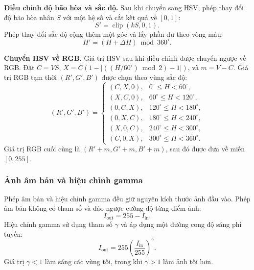 \documentclass[12pt]{article}
\numberwithin{equation}{section}
\begin{document}
\textbf{Điều chỉnh độ bão hòa và sắc độ.}
Sau khi chuyển sang HSV, phép thay đổi độ bão hòa nhân $S$ với một hệ số và cắt
kết quả về $[0,1]$:
\begin{equation}
S' = \operatorname{clip}(kS,0,1).
\label{eq:saturation}
\end{equation}
Phép thay đổi sắc độ cộng thêm một góc và lấy phần dư theo vòng màu:
\begin{equation}
H' = (H+\Delta H) \bmod 360^\circ.
\label{eq:hue-shift}
\end{equation}

\textbf{Chuyển HSV về RGB.}
Giá trị HSV sau khi điều chỉnh được chuyển ngược về RGB. Đặt
$C=VS$, $X=C(1-|((H/60^\circ)\bmod 2)-1|)$, và $m=V-C$. Giá trị RGB tạm thời
$(R',G',B')$ được chọn theo vùng sắc độ:
\begin{equation}
(R',G',B') =
\begin{cases}
(C,X,0), & 0^\circ \le H < 60^\circ,\\
(X,C,0), & 60^\circ \le H < 120^\circ,\\
(0,C,X), & 120^\circ \le H < 180^\circ,\\
(0,X,C), & 180^\circ \le H < 240^\circ,\\
(X,0,C), & 240^\circ \le H < 300^\circ,\\
(C,0,X), & 300^\circ \le H < 360^\circ.
\end{cases}
\label{eq:hsv-rgb-sector}
\end{equation}
Giá trị RGB cuối cùng là $(R'+m,G'+m,B'+m)$, sau đó được đưa về miền $[0,255]$.

\subsubsection{Ảnh âm bản và hiệu chỉnh gamma}

Phép âm bản và hiệu chỉnh gamma đều giữ nguyên kích thước ảnh đầu vào. Phép âm
bản không có tham số và đảo ngược cường độ từng điểm ảnh:
\begin{equation}
I_{\text{out}} = 255 - I_{\text{in}}.
\label{eq:negative}
\end{equation}
Hiệu chỉnh gamma sử dụng tham số $\gamma$ và áp dụng một đường cong độ sáng phi
tuyến:
\begin{equation}
I_{\text{out}} = 255\left(\frac{I_{\text{in}}}{255}\right)^\gamma.
\label{eq:gamma}
\end{equation}
Giá trị $\gamma<1$ làm sáng các vùng tối, trong khi $\gamma>1$ làm ảnh tối hơn.

\end{document}
